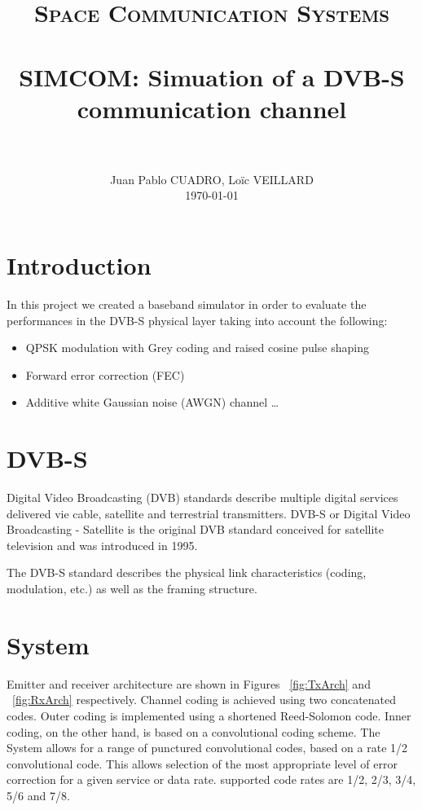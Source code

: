 \documentclass[paper=a4, fontsize=11pt]{scrartcl}	%
\title{
		\usefont{OT1}{bch}{b}{n}
		\normalfont \normalsize \textsc{Space Communication Systems} \\ [25pt]
		\horrule{0.5pt} \\[0.4cm]
		\huge SIMCOM: Simuation of a DVB-S communication channel \\
		\horrule{2pt} \\[0.5cm]
}
\author{
		\normalfont 								\normalsize
        Juan Pablo CUADRO, Lo\"{i}c VEILLARD\\[-3pt]	\normalsize
        \today
}
\date{}
\numberwithin{equation}{section}		%
\numberwithin{figure}{section}			%
\numberwithin{table}{section}			%
\begin{document}
\maketitle

\section{Introduction}
In this project we created a baseband simulator in order to evaluate the performances in the DVB-S physical layer taking into account the following:

\begin{itemize}

  \item QPSK modulation with Grey coding and raised cosine pulse shaping
  \item Forward error correction (FEC)
  \item Additive white Gaussian noise (AWGN) channel \ldots

\end{itemize}

\section{DVB-S}

Digital Video Broadcasting (DVB) standards describe multiple digital services delivered vie cable, satellite and terrestrial transmitters. DVB-S or Digital Video Broadcasting - Satellite is the original DVB standard conceived for satellite television and was introduced in 1995. 

The DVB-S standard describes the physical link characteristics (coding, modulation, etc.) as well as the framing structure. 

\section{System}

Emitter and receiver architecture are shown in Figures ~\ref{fig:TxArch} and ~\ref{fig:RxArch} respectively. Channel coding is achieved using two concatenated codes. Outer coding is implemented using a shortened Reed-Solomon code. Inner coding, on the other hand, is based on a convolutional coding scheme. The System allows for a range of punctured convolutional codes, based on a rate 1/2 convolutional code. This allows selection of the most appropriate level of error correction for a given service or data rate. supported code rates are 1/2, 2/3, 3/4, 5/6 and 7/8.
\end{document}
